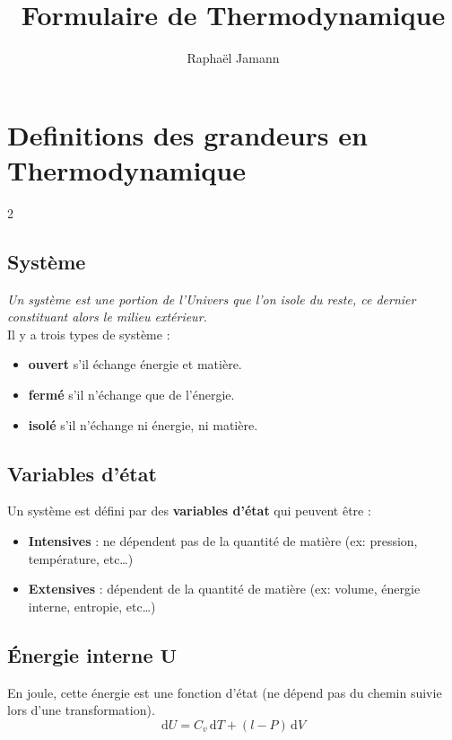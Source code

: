 \documentclass[a4paper,12pt]{article}
\title{Formulaire de Thermodynamique}
\author{Raphaël Jamann}
\date{}
\newcommand{\diff}{\mathrm{d}} %
\begin{document}
\maketitle


\section{Definitions des grandeurs en Thermodynamique}

    \begin{multicols}{2}

    \subsection*{Système}

    \textit{Un système est une portion de l'Univers que l'on isole du reste,
    ce dernier constituant alors le milieu extérieur.}\\
    Il y a trois types de système :
    \begin{itemize}[label=\textbullet]
        \item \textbf{ouvert} s'il échange énergie et matière.
        \item \textbf{fermé} s'il n'échange que de l'énergie.
        \item \textbf{isolé} s'il n'échange ni énergie, ni matière.
    \end{itemize}

    \subsection*{Variables d'état}
    Un système est défini par des \textbf{variables d'état} qui peuvent être :
    \begin{itemize}[label=\textbullet]
        \item \textbf{Intensives} : ne dépendent pas de la quantité de matière (ex: pression, température, etc\dots)
        \item \textbf{Extensives} : dépendent de la quantité de matière (ex: volume, énergie interne, entropie, etc\dots)
    \end{itemize}


    \subsection*{Énergie interne $\bm{U}$}
        En joule, cette énergie est une fonction d'état (ne dépend pas du chemin suivie lors d'une transformation).
        $$ \boxed{ \diff U = C_v \, \diff T + (l - P) \, \diff V } $$


\end{multicols}
\end{document}
